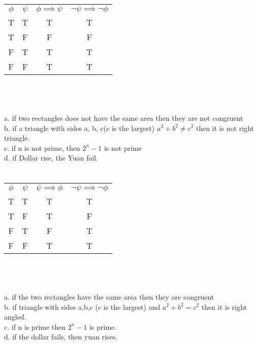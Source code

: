 \documentclass{article}
\begin{document}
\section{}
\begin{tabular}{ c c c c }
  $\phi$ & $\psi$ & $\phi \implies \psi$ & $\neg \psi \implies \neg \phi$ \\
  T      & T      & T                    & T                              \\
  T      & F      & F                    & F                              \\
  F      & T      & T                    & T                              \\
  F      & F      & T                    & T                              \\
\end{tabular} \\

\section{}
a. if two rectangles does not have the same area then they are not congruent \\
b. if a triangle with sides a, b, c(c is the largest) $a^2 + b^2 \neq c^2$ then it is not right triangle. \\
c. if n is not prime, then $2^n - 1$ is not prime \\
d. if Dollar rise, the Yuan fail.

\section{}
\begin{tabular}{ c c c c }
  $\phi$ & $\psi$ & $\psi \implies \phi$ & $\neg \psi \implies \neg \phi$ \\
  T      & T      & T                    & T                              \\
  T      & F      & T                    & F                              \\
  F      & T      & F                    & T                              \\
  F      & F      & T                    & T                              \\
\end{tabular} \\

\section{}
a. if the two rectangles have the same area then they are congruent \\
b. if triangle with sides a,b,c (c is the largest) and $a^2 + b^2 = c^2$ then it is right angled. \\
c. if n is prime then $2^n - 1$ is prime. \\
d. if the dollar fails, then yuan rises. \\
\end{document}
